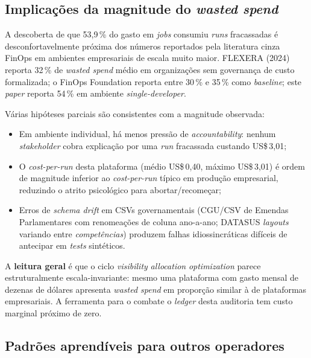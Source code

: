 \documentclass[12pt,a4paper,oneside]{article}
\newcommand{\us}{US\$\,}
\begin{document}
\subsection{Implicações da magnitude do \textit{wasted spend}}

A descoberta de que 53,9\,\% do gasto em \textit{jobs} consumiu
\textit{runs} fracassadas é desconfortavelmente próxima dos números
reportados pela literatura cinza FinOps em ambientes empresariais
de escala muito maior. FLEXERA (2024) reporta 32\,\% de
\textit{wasted spend} médio em organizações sem governança de custo
formalizada; o FinOps Foundation reporta entre 30\,\% e 35\,\% como
\textit{baseline}; este \textit{paper} reporta 54\,\% em ambiente
\textit{single-developer}.

Várias hipóteses parciais são consistentes com a magnitude
observada:

\begin{itemize}\setlength{\itemsep}{2pt}
  \item Em ambiente individual, há menos pressão de
        \textit{accountability}: nenhum \textit{stakeholder}
        cobra explicação por uma \textit{run} fracassada custando
        \us 3{,}01;
  \item O \textit{cost-per-run} desta plataforma (médio \us 0{,}40,
        máximo \us 3{,}01) é ordem de magnitude inferior ao
        \textit{cost-per-run} típico em produção empresarial,
        reduzindo o atrito psicológico para abortar/recomeçar;
  \item Erros de \textit{schema drift} em CSVs governamentais
        (CGU/CSV de Emendas Parlamentares com renomeações de coluna
        ano-a-ano; DATASUS \textit{layouts} variando entre
        \textit{competências}) produzem falhas idiossincráticas
        difíceis de antecipar em \textit{tests} sintéticos.
\end{itemize}

A \textbf{leitura geral} é que o ciclo
\textit{visibility} \textrightarrow{} \textit{allocation}
\textrightarrow{} \textit{optimization} parece estruturalmente
escala-invariante: mesmo uma plataforma com gasto mensal de
dezenas de dólares apresenta \textit{wasted spend} em proporção
similar à de plataformas empresariais. A ferramenta para o
combate \textemdash{} o \textit{ledger} desta auditoria
\textemdash{} tem custo marginal próximo de zero.

\subsection{Padrões aprendíveis para outros operadores}
\end{document}
